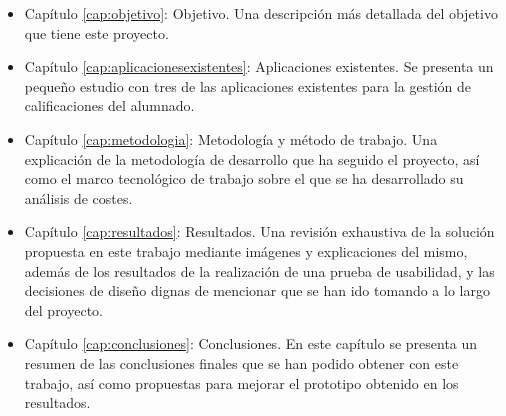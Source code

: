 \begin{itemize}
    \item Capítulo \ref{cap:objetivo}: Objetivo. Una descripción más detallada del objetivo que tiene este proyecto.
    \item Capítulo \ref{cap:aplicacionesexistentes}: Aplicaciones existentes. Se presenta un pequeño estudio con tres de las aplicaciones existentes para la gestión de calificaciones del alumnado.
    \item Capítulo \ref{cap:metodologia}: Metodología y método de trabajo. Una explicación de la metodología de desarrollo que ha seguido el proyecto, así como el marco tecnológico de trabajo sobre el que se ha desarrollado su análisis de costes.
    \item Capítulo \ref{cap:resultados}: Resultados. Una revisión exhaustiva de la solución propuesta en este trabajo mediante imágenes y explicaciones del mismo, además de los resultados de la realización de una prueba de usabilidad, y las decisiones de diseño dignas de mencionar que se han ido tomando a lo largo del proyecto.
    \item Capítulo \ref{cap:conclusiones}: Conclusiones. En este capítulo se presenta un resumen de las conclusiones finales que se han podido obtener con este trabajo, así como propuestas para mejorar el prototipo obtenido en los resultados.
\end{itemize}
